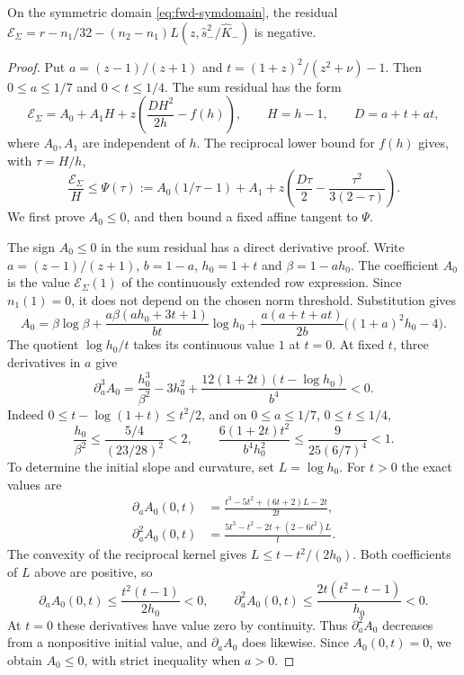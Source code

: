 \begin{lemma}\label{lem:fwd-sum}
On the symmetric domain \eqref{eq:fwd-symdomain}, the residual
$\mathcal E_\Sigma=r-n_1/32-(n_2-n_1)L(z,\hat s_-^2/\hat K_-)$ is negative.
\end{lemma}

\begin{proof}
Put $a=(z-1)/(z+1)$ and $t=(1+z)^2/(z^2+\nu)-1$.
Then $0\le a\le1/7$ and $0<t\le1/4$.
The sum residual has the form
\[
 \mathcal E_\Sigma=A_0+A_1H
       +z\left(\frac{DH^2}{2h}-f(h)\right),\qquad
 H=h-1,\qquad D=a+t+at,
\]
where $A_0,A_1$ are independent of $h$.
The reciprocal lower bound for $f(h)$ gives, with $\tau=H/h$,
\[
 \frac{\mathcal E_\Sigma}{H}\le\Psi(\tau):=
 A_0(1/\tau-1)+A_1
       +z\left(\frac{D\tau}{2}-\frac{\tau^2}{3(2-\tau)}\right).
\]
We first prove $A_0\le0$, and then bound a fixed affine tangent to $\Psi$.

The sign $A_0\le0$ in the sum residual has a direct derivative proof.
Write $a=(z-1)/(z+1)$, $b=1-a$, $h_0=1+t$ and $\beta=1-ah_0$.
The coefficient $A_0$ is the value $\mathcal E_\Sigma(1)$ of the continuously
extended row expression. Since $n_1(1)=0$, it does not depend on the
chosen norm threshold. Substitution gives
\[
 A_0=\beta\log\beta+
 \frac{a\beta(ah_0+3t+1)}{bt}\log h_0
 +\frac{a(a+t+at)}{2b}\bigl((1+a)^2h_0-4\bigr).
\]
The quotient $\log h_0/t$ takes its continuous value $1$ at $t=0$.
At fixed $t$, three derivatives in $a$ give
\[
 \partial_a^3A_0=\frac{h_0^3}{\beta^2}-3h_0^2
                 +\frac{12(1+2t)(t-\log h_0)}{b^4}<0.
\]
Indeed $0\le t-\log(1+t)\le t^2/2$, and on
$0\le a\le1/7$, $0\le t\le1/4$,
\[
 \frac{h_0}{\beta^2}\le\frac{5/4}{(23/28)^2}<2,
 \qquad
 \frac{6(1+2t)t^2}{b^4h_0^2}
 \le\frac{9}{25(6/7)^4}<1.
\]
To determine the initial slope and curvature, set $L=\log h_0$.
For $t>0$ the exact values are
\begin{align*}
 \partial_aA_0(0,t)&=\frac{t^3-5t^2+(6t+2)L-2t}{2t},\\
 \partial_a^2A_0(0,t)&=\frac{5t^3-t^2-2t+(2-6t^2)L}{t}.
\end{align*}
The convexity of the reciprocal kernel gives
$L\le t-t^2/(2h_0)$. Both coefficients of $L$ above are positive, so
\[
 \partial_aA_0(0,t)\le\frac{t^2(t-1)}{2h_0}<0,
 \qquad
 \partial_a^2A_0(0,t)\le\frac{2t(t^2-t-1)}{h_0}<0.
\]
At $t=0$ these derivatives have value zero by continuity.
Thus $\partial_a^2A_0$ decreases from a nonpositive initial value,
and $\partial_aA_0$ does likewise. Since $A_0(0,t)=0$, we obtain
$A_0\le0$, with strict inequality when $a>0$.


\end{proof}
